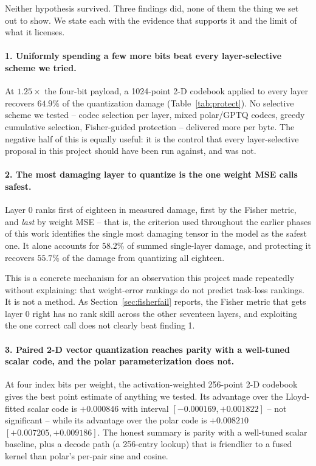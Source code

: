 Neither hypothesis survived. Three findings did, none of them the thing we set
out to show. We state each with the evidence that supports it and the limit of
what it licenses.

\paragraph{1. Uniformly spending a few more bits beat every layer-selective
scheme we tried.} At $1.25\times$ the four-bit payload, a 1024-point 2-D
codebook applied to every layer recovers $64.9\%$ of the quantization damage
(Table~\ref{tab:protect}). No selective scheme we tested -- codec selection per
layer, mixed polar/GPTQ codecs, greedy cumulative selection, Fisher-guided
protection -- delivered more per byte. The negative half of this is equally
useful: it is the control that every layer-selective proposal in this project
should have been run against, and was not.

\paragraph{2. The most damaging layer to quantize is the one weight MSE calls
safest.} Layer 0 ranks first of eighteen in measured damage, first by the Fisher
metric, and \emph{last} by weight MSE -- that is, the criterion used throughout
the earlier phases of this work identifies the single most damaging tensor in
the model as the safest one. It alone accounts for $58.2\%$ of summed
single-layer damage, and protecting it recovers $55.7\%$ of the damage from
quantizing all eighteen.

This is a concrete mechanism for an observation this project made repeatedly
without explaining: that weight-error rankings do not predict task-loss
rankings. It is not a method. As Section~\ref{sec:fisherfail} reports, the
Fisher metric that gets layer 0 right has no rank skill across the other
seventeen layers, and exploiting the one correct call does not clearly beat
finding 1.

\paragraph{3. Paired 2-D vector quantization reaches parity with a well-tuned
scalar code, and the polar parameterization does not.} At four index bits per
weight, the activation-weighted 256-point 2-D codebook gives the best point
estimate of anything we tested. Its advantage over the Lloyd-fitted scalar code
is $+0.000846$ with interval $[-0.000169,+0.001822]$ -- not significant -- while
its advantage over the polar code is $+0.008210$ $[+0.007205,+0.009186]$. The
honest summary is parity with a well-tuned scalar baseline, plus a decode path
(a 256-entry lookup) that is friendlier to a fused kernel than polar's per-pair
sine and cosine.

